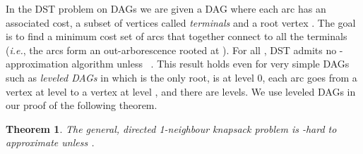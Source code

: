 \documentclass[12pt]{article}
\newtheorem{theorem}{Theorem}
\newcommand{\DST}{{DST}\xspace}
\begin{document}
In the \DST problem on DAGs we are given a DAG  where each arc has an associated cost, a subset of 
vertices called {\em terminals} and a root vertex .  The goal
is to find a minimum cost set of arcs that together connect  to all
the terminals ({\em i.e.}, the arcs form an out-arborescence rooted at
).  For all , \DST admits no
-approximation algorithm unless ~\cite{HK}.  This result holds even for very
simple DAGs such as {\em leveled DAGs} in which  is the only root,  is at level 0,
each arc goes from a vertex at level  to a vertex at level ,
and there are  levels.  We use leveled DAGs in our proof of the following theorem.





\begin{theorem} \label{thm:gd1nlb}
The general, directed 1-neighbour knapsack problem is
-hard to approximate unless .
\end{theorem}
\end{document}

